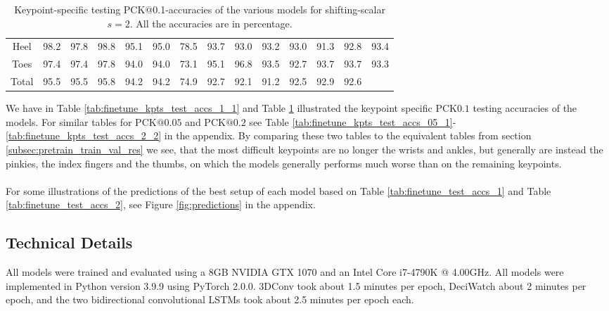 \documentclass[./main.tex]{subfiles}
\begin{document}
\begin{table}[htbp]
\begin{adjustbox}{center}
\begin{tabular}{c||ccc|ccc|ccc|ccc|c}
            Heel & 98.2 & 97.8 & 98.8 & 95.1 & 95.0 & 78.5 & 93.7 & 93.0 & 93.2 & 93.0 & 91.3 & 92.8 & 93.4 \\
            Toes & 97.4 & 97.4 & 97.8 & 94.0 & 94.0 & 73.1 & 95.1 & 96.8 & 93.5 & 92.7 & 93.7 & 93.7 & 93.3 \\
            \hline
            Total & 95.5 & 95.5 & 95.8 & 94.2 & 94.2 & 74.9 & 92.7 & 92.1 & 91.2 & 92.5 & 92.9 & 92.6 & \\
            \hline
        \end{tabular}
    \end{adjustbox}
    \caption{Keypoint-specific testing PCK@0.1-accuracies of the various models for shifting-scalar $s = 2$. All the accuracies are in percentage.}
    \label{tab:finetune_kpts_test_accs_1_2}
\end{table}

\noindent We have in Table \ref{tab:finetune_kpts_test_accs_1_1} and Table \ref{tab:finetune_kpts_test_accs_1_2} illustrated the keypoint specific PCK$0.1$ testing accuracies of the models. For similar tables for PCK$@0.05$ and PCK$@0.2$ see Table \ref{tab:finetune_kpts_test_accs_05_1}-\ref{tab:finetune_kpts_test_accs_2_2} in the appendix. By comparing these two tables to the equivalent tables from section \ref{subsec:pretrain_train_val_res} we see, that the most difficult keypoints are no longer the wrists and ankles, but generally are instead the pinkies, the index fingers and the thumbs, on which the models generally performs much worse than on the remaining keypoints.
\\
\\
For some illustrations of the predictions of the best setup of each model based on Table \ref{tab:finetune_test_accs_1} and Table \ref{tab:finetune_test_accs_2}, see Figure \ref{fig:predictions} in the appendix.

\subsection{Technical Details}
\label{sec:finetune_tech_details}
All models were trained and evaluated using a 8GB NVIDIA GTX 1070 and an Intel Core i7-4790K @ 4.00GHz. All models were implemented in Python version 3.9.9 using PyTorch 2.0.0. 3DConv took about 1.5 minutes per epoch, DeciWatch about 2 minutes per epoch, and the two bidirectional convolutional LSTMs took about 2.5 minutes per epoch each.
\end{document}
